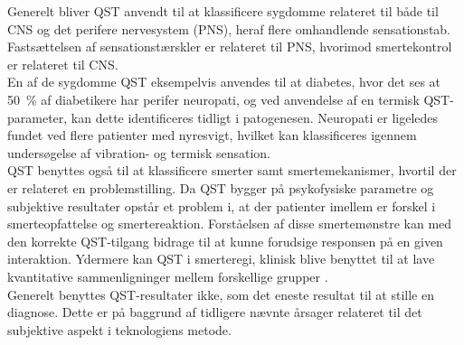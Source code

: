 Generelt bliver QST anvendt til at klassificere sygdomme relateret til både til CNS og det perifere nervesystem (PNS), heraf flere omhandlende sensationstab. Fastsættelsen af sensationstærskler er relateret til PNS, hvorimod smertekontrol er relateret til CNS. \\ 
En af de sygdomme QST eksempelvis anvendes til at diabetes, hvor det ses at 50~\% af diabetikere har perifer neuropati, og ved anvendelse af en termisk QST-parameter, kan dette identificeres tidligt i patogenesen. Neuropati er ligeledes fundet ved flere patienter med nyresvigt, hvilket kan klassificeres igennem undersøgelse af vibration- og termisk sensation. \citep{Yarnitsky2006} \citep{Yarnitsky1997} \\
QST benyttes også til at klassificere smerter samt smertemekanismer, hvortil der er relateret en problemstilling. Da QST bygger på psykofysiske parametre og subjektive resultater opstår et problem i, at der patienter imellem er forskel i smerteopfattelse og smertereaktion. \citep{Yarnitsky1997} Forståelsen af disse smertemønstre kan med den korrekte QST-tilgang bidrage til at kunne forudsige responsen på en given interaktion. \citep{Yarnitsky2006} Ydermere kan QST i smerteregi, klinisk blive benyttet til at lave kvantitative sammenligninger mellem forskellige grupper \citep{Arendt-Nielsen2009}. \\
Generelt benyttes QST-resultater ikke, som det eneste resultat til at stille en diagnose. Dette er på baggrund af tidligere nævnte årsager relateret til det subjektive aspekt i teknologiens metode. \citep{Yarnitsky2006}

